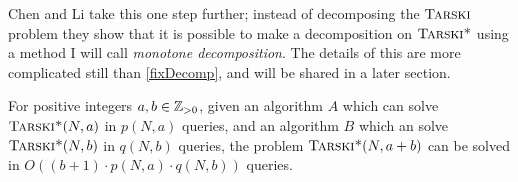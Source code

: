Chen and Li take this one step further; instead of decomposing the $\textsc{Tarski}$ problem
they show that it is possible to make a decomposition on $\textsc{Tarski*}$ using a method
I will call \emph{monotone decomposition}. The details
of this are more complicated still than \cref{fixDecomp}, and will be shared in a later
section.
\begin{theorem}
  For positive integers $a, b \in \mathbb{Z}_{> 0}$, given an algorithm $A$
  which can solve $\textsc{Tarski*}(N, a)$ in $p(N, a)$ queries, and an algorithm $B$
  which an solve $\textsc{Tarski*}(N, b)$ in $q(N, b)$ queries, the problem $\textsc{Tarski*}(N, a + b)$
  can be solved in $O((b + 1) \cdot p(N, a) \cdot q(N, b))$ queries.
\end{theorem}
